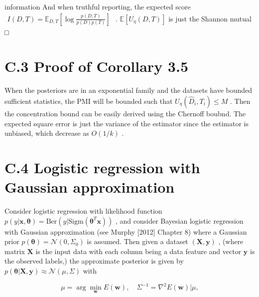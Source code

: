 information And when truthful reporting, the expected score
\(\begin{array} { r } { I ( D , T ) = \mathbb { E } _ { D , T } \left[ \log \frac { p ( D , T ) } { p ( D ) p ( T ) } \right] } \end{array}\)
. \(\mathbb { E } [ U _ { \eta } ( D , T ) ]\) is just the Shannon
mutual □

\section{C.3 Proof of Corollary 3.5}\label{c.3-proof-of-corollary-3.5}

When the posteriors are in an exponential family and the datasets have
bounded sufficient statistics, the PMI will be bounded such that
\(U _ { \eta } ( \widehat { D } _ { i } , T _ { i } ) \leq M\) . Then
the concentration bound can be easily derived using the Chernoff boubnd.
The expected square error is just the variance of the estimator since
the estimator is unbiased, which decrease as \(O ( 1 / k )\) .

\section{C.4 Logistic regression with Gaussian
approximation}\label{c.4-logistic-regression-with-gaussian-approximation}

Consider logistic regression with likelihood function
\(p ( y | \mathbf x , \pmb \theta ) = \mathrm { B e r } ( y | \mathrm { S i g m } ( \pmb \theta ^ { T } \mathbf x ) )\)
, and consider Bayesian logistic regression with Gaussian approximation
(see Murphy {[}2012{]} Chapter 8) where a Gaussian prior
\(p ( \pmb \theta ) = \mathcal { N } ( 0 , \Sigma _ { 0 } )\) is
assumed. Then given a dataset \(( \mathbf { X } , \mathbf { y } )\) ,
(where matrix \(\mathbf { X }\) is the input data with each column being
a data feature and vector \(\mathbf { y }\) is the observed labels,) the
approximate posterior is given by
\(p ( \pmb \theta | \mathbf { X } , \mathbf { y } ) \approx \mathcal { N } ( \mu , \Sigma )\)
with

\[
\mu = \arg \operatorname* { m i n } _ { \mathbf { w } } E ( \mathbf { w } ) , \quad \Sigma ^ { - 1 } = \nabla ^ { 2 } E ( \mathbf { w } ) | \mu ,
\]

